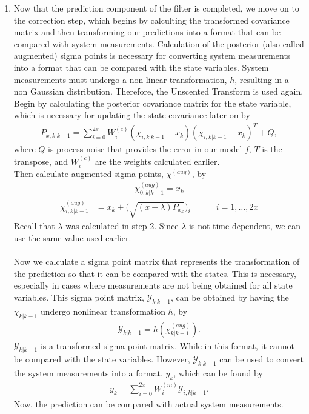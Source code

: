\begin{enumerate}
        
                \item Now that the prediction component of the filter is completed, we move on to the correction step, which begins by calculting the transformed covariance matrix and then transforming our predictions into a format that can be compared with system measurements. Calculation of the posterior (also called augmented) sigma points is necessary for converting system measurements into a format that can be compared with the state variables. System measurements must undergo a non linear transformation, $h$, resulting in a non Gaussian distribution. Therefore, the Unscented Transform is used again.
                Begin by calculating the posterior covariance matrix for the state variable, which is necessary for updating the state covariance later on by
        \begin{align*}
        P_{x, k | k-1} = \sum^{2x}_{i = 0} W_i^{(c)} (\chi_{i, k | k - 1} -   x_{k} )(\chi_{i, k | k - 1} - x_{k} )^T + Q,
        \end{align*} 
        where $Q$ is process noise that provides the error in our model $f$, $T$ is the transpose, and $W_i^{(c)}$ are the weights calculated earlier. \\     
                
\noindent Then calculate augmented sigma points, $\chi^{(aug)}$, by
      \begin{align*}
        \chi^{(aug)}_{0, k|k-1} =  x_{k}
        \end{align*}
         \begin{align*}
        \chi^{(aug)}_{ i,k |k-1} &= x_k  \pm \bigg(\sqrt{(x+\lambda)P_{x_k}} \bigg)_{i} \quad \quad \quad  i=1,\dots,2x
        \end{align*}
        Recall that $\lambda$ was calculated in step 2. Since $\lambda$ is not time dependent, we can use the same value used earlier. \\ \\
        Now we calculate a sigma point matrix that represents the transformation of the prediction so that it can be compared with the states. This is necessary, especially in cases where measurements are not being obtained for all state variables. This sigma point matrix, $\mathcal{Y}_{k|k-1}$, can be obtained by having the $\chi_{k|k-1}$ undergo nonlinear transformation $h$, by
         \begin{align*}
       \mathcal{Y}_{k|k-1} = h(\chi^{(aug)}_{k|k-1}).
       \end{align*}
       $\mathcal{Y}_{k|k-1} $ is a transformed sigma point matrix. While in this format, it cannot be compared with the state variables. However, $\mathcal{Y}_{k|k-1}$ can be used to convert the system measurements into a format, $y_{k} $, which can be found by 
       \begin{align*}
       y_{k} = \sum^{2x}_{i = 0} W_i^{(m)}  \mathcal{Y}_{i, k | k - 1}.
       \end{align*}
       Now, the prediction can be compared with actual system measurements.
       

\end{enumerate}
